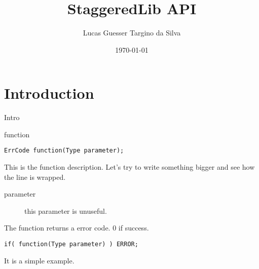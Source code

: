 

\title{StaggeredLib API}
\author{Lucas Guesser Targino da Silva}
\date{\today}



\maketitle

\tableofcontents

\chapter{Introduction}
Intro

\begin{function}{function}
		\begin{lstlisting}
ErrCode function(Type parameter);
		\end{lstlisting}
	\functiondescription
		This is the function description. Let's try to write
		something bigger and see how the line is wrapped.
	\parameters
		\begin{description}
			\item[parameter] this parameter is unuseful.
		\end{description}
	\return
		The function returns a error code. 0 if success.
	\codeexample
		\begin{lstlisting}
if( function(Type parameter) ) ERROR;
		\end{lstlisting}
	\notes
		It is a simple example.
\end{function}
	

